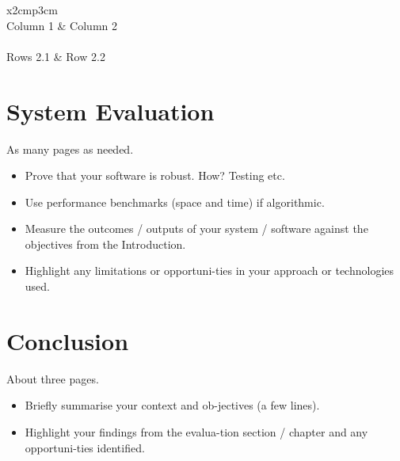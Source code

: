 \begin{table}[h]
  \centering
  \begin{tabular}{x{2cm}p{3cm}}
    \toprule \\
    Column 1 & Column 2 \\
    \midrule \\
    Rows 2.1 & Row 2.2 \\
    \bottomrule
  \end{tabular}
  \caption{A table.}
  \label{table:mytable}
\end{table}

\chapter{System Evaluation}
As many pages as needed.
\begin{itemize}
\item Prove that your software is robust. How? Testing etc. 
\item Use performance benchmarks (space and time) if algorithmic.
\item Measure the outcomes / outputs of your system / software against the objectives from the Introduction.
\item Highlight any limitations or opportuni-ties in your approach or technologies used.
\end{itemize}

\chapter{Conclusion}
About three pages.

\begin{itemize}
\item Briefly summarise your context and ob-jectives (a few lines).
\item Highlight your findings from the evalua-tion section / chapter and any opportuni-ties identified.
\end{itemize}

